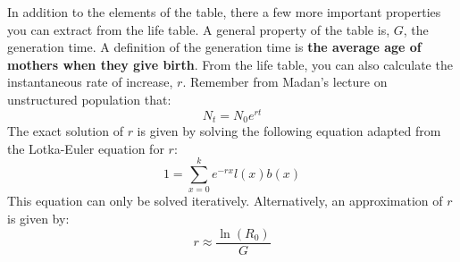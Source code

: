 \documentclass{article}\usepackage[]{graphicx}\usepackage[]{color}
\begin{document}
In addition to the elements of the table, there a few more important properties you can extract from the life table. A general property of the table is, $G$, the generation time. A definition of the generation time is \textbf{the average age of mothers when they give birth}. From the life table, you can also calculate the instantaneous rate of increase, $r$. Remember from Madan's lecture on unstructured population that:
\begin{equation}
N_t=N_0e^{rt}
\end{equation}
The exact solution of $r$ is given by solving the following equation adapted from the Lotka-Euler equation for $r$:
\begin{equation}
1=\sum\limits_{x=0}^k e^{-rx}l(x)b(x)
\end{equation}
This equation can only be solved iteratively. Alternatively, an approximation of $r$ is given by:
\begin{equation}
r \approx \frac{\ln(R_0)}{G}
\end{equation}
\end{document}
